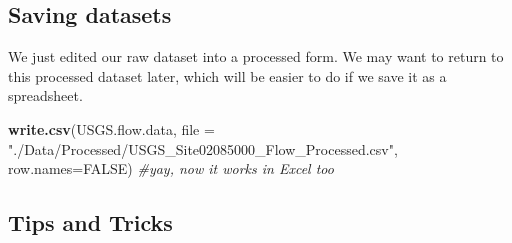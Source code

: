 \documentclass[]{article}
\newenvironment{Shaded}{\begin{snugshade}}{\end{snugshade}}
\newcommand{\CommentTok}[1]{\textcolor[rgb]{0.56,0.35,0.01}{\textit{#1}}}
\newcommand{\ControlFlowTok}[1]{\textcolor[rgb]{0.13,0.29,0.53}{\textbf{#1}}}
\newcommand{\DataTypeTok}[1]{\textcolor[rgb]{0.13,0.29,0.53}{#1}}
\newcommand{\DecValTok}[1]{\textcolor[rgb]{0.00,0.00,0.81}{#1}}
\newcommand{\KeywordTok}[1]{\textcolor[rgb]{0.13,0.29,0.53}{\textbf{#1}}}
\newcommand{\NormalTok}[1]{#1}
\newcommand{\OperatorTok}[1]{\textcolor[rgb]{0.81,0.36,0.00}{\textbf{#1}}}
\newcommand{\OtherTok}[1]{\textcolor[rgb]{0.56,0.35,0.01}{#1}}
\newcommand{\StringTok}[1]{\textcolor[rgb]{0.31,0.60,0.02}{#1}}
\begin{document}
\begin{Shaded}
\end{Shaded}

\hypertarget{saving-datasets}{%
\subsection{Saving datasets}\label{saving-datasets}}

We just edited our raw dataset into a processed form. We may want to
return to this processed dataset later, which will be easier to do if we
save it as a spreadsheet.

\begin{Shaded}
\begin{Highlighting}[]
\KeywordTok{write.csv}\NormalTok{(USGS.flow.data, }\DataTypeTok{file =} \StringTok{"./Data/Processed/USGS_Site02085000_Flow_Processed.csv"}\NormalTok{, }\DataTypeTok{row.names=}\OtherTok{FALSE}\NormalTok{) }\CommentTok{#yay, now it works in Excel too}
\end{Highlighting}
\end{Shaded}

\hypertarget{tips-and-tricks}{%
\subsection{Tips and Tricks}\label{tips-and-tricks}}
\end{document}
